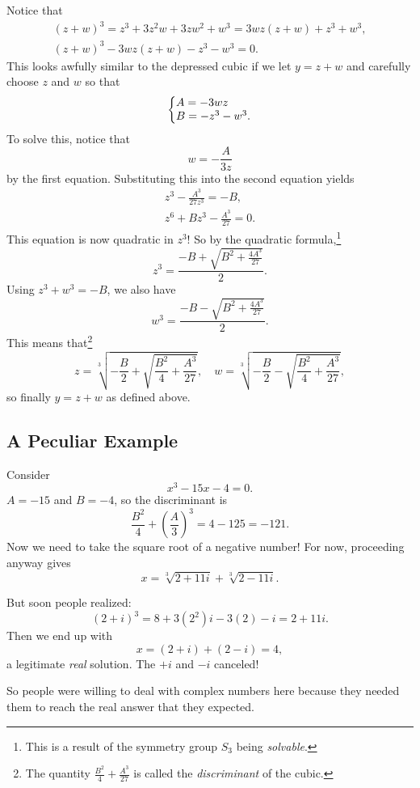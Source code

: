 Notice that
\begin{gather*}
  (z + w)^3 = z^3 + 3z^2w + 3zw^2 + w^3 = 3wz(z + w) + z^3 + w^3, \\
  (z + w)^3 - 3wz(z + w) - z^3 - w^3 = 0.
\end{gather*}
This looks awfully similar to the depressed cubic if
we let $y = z + w$ and carefully choose $z$ and $w$
so that
\[
\left\{\begin{array}{@{}l@{}}
  A = -3wz \\
  B = -z^3 - w^3.
\end{array}\right.
\] 
To solve this, notice that
\[w = -\frac{A}{3z}\]
by the first equation. Substituting this into the second
equation yields
\begin{gather*}
  z^3 - \frac{A^3}{27z^3} = -B, \\
  z^6 + Bz^3 - \frac{A^3}{27} = 0.
\end{gather*}
This equation is now quadratic
in $z^3$!
So by the quadratic formula,\footnote{This is a result of the symmetry group $S_3$ being \textit{solvable}.}
\[
  z^3 = \frac{-B + \sqrt{B^2 + \frac{4A^3}{27}}}{2}
.\] 
Using $z^3 + w^3 = -B$, we also have
\[
  w^3 = \frac{-B - \sqrt{B^2 + \frac{4A^3}{27}}}{2}
.\] 
This means that\footnote{The quantity $\frac{B^2}{4} + \frac{A^3}{27}$ is called the \textit{discriminant} of the cubic.}
\[
  z = \sqrt[3]{-\frac{B}{2} + \sqrt{\frac{B^2}{4} + \frac{A^3}{27}}}, \quad
  w = \sqrt[3]{-\frac{B}{2} - \sqrt{\frac{B^2}{4} + \frac{A^3}{27}}},
\]
so finally $y = z + w$ as defined above.

\subsection{A Peculiar Example}
Consider
\[x^3 - 15x - 4 = 0.\]
$A = -15$ and $B = -4$, so the discriminant is
 \[
\frac{B^2}{4} + \left(\frac{A}{3}\right)^3 = 4 - 125 = -121
.\]
Now we need to take the square root of a negative
number! For now, proceeding anyway gives
\[
x = \sqrt[3]{2 + 11i} + \sqrt[3]{2 - 11i}
.\] 

But soon people realized:
\[
  (2 + i)^3 = 8 + 3(2^2)i - 3(2) - i = 2 + 11i
.\] 
Then we end up with
\[x = (2 + i) + (2 - i) = 4,\]
a legitimate \textit{real} solution. The $+i$ and $-i$
canceled!

So people were willing to deal with complex
numbers here because they needed them to reach the real
answer that they expected.
